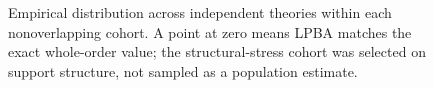 \begin{figure}[H]
\caption{Empirical distribution across independent theories within each nonoverlapping cohort. A point at zero means LPBA matches the exact whole-order value; the structural-stress cohort was selected on support structure, not sampled as a population estimate.\label{fig:regret}}
\end{figure}
